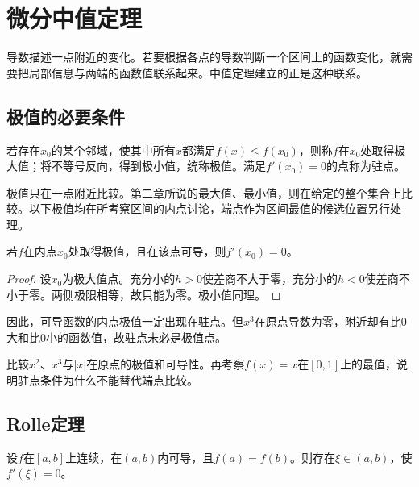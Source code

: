 \FloatBarrier
\newpage
\section{微分中值定理}
\label{sec:calculus-mean-value}

\begingroup
\setlength{\parskip}{5pt}

导数描述一点附近的变化。若要根据各点的导数判断一个区间上的函数变化，就需要把局部信息与两端的函数值联系起来。中值定理建立的正是这种联系。

\subsection{极值的必要条件}

\begin{definition}
若存在\(x_0\)的某个邻域，使其中所有\(x\)都满足\(f(x)\le f(x_0)\)，则称\(f\)在\(x_0\)处取得{\heiti{}极大值}；将不等号反向，得到{\heiti{}极小值}，统称{\heiti{}极值}。满足\(f'(x_0)=0\)的点称为{\heiti{}驻点}。
\end{definition}

极值只在一点附近比较。第二章所说的最大值、最小值，则在给定的整个集合上比较。以下极值均在所考察区间的内点讨论，端点作为区间最值的候选位置另行处理。

\begin{theorem}[Fermat定理]\label{thm:calculus-fermat}
若\(f\)在内点\(x_0\)处取得极值，且在该点可导，则\(f'(x_0)=0\)。
\end{theorem}

\begin{proof}
设\(x_0\)为极大值点。充分小的\(h>0\)使差商不大于零，充分小的\(h<0\)使差商不小于零。两侧极限相等，故只能为零。极小值同理。
\end{proof}

因此，可导函数的内点极值一定出现在驻点。但\(x^3\)在原点导数为零，附近却有比\(0\)大和比\(0\)小的函数值，故驻点未必是极值点。

\begin{example}
比较\(x^2\)、\(x^3\)与\(|x|\)在原点的极值和可导性。再考察\(f(x)=x\)在\([0,1]\)上的最值，说明驻点条件为什么不能替代端点比较。
\end{example}

\subsection{Rolle定理}

\begin{theorem}[Rolle定理]\label{thm:calculus-rolle}
设\(f\)在\([a,b]\)上连续，在\((a,b)\)内可导，且\(f(a)=f(b)\)。则存在\(\xi\in(a,b)\)，使\(f'(\xi)=0\)。
\end{theorem}

